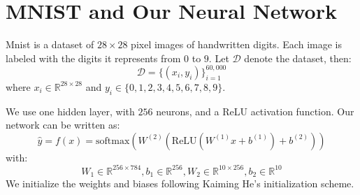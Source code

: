 \documentclass[10pt,a4paper]{article}
\begin{document}
\section{MNIST and Our Neural Network}
Mnist is a dataset of $28 \times 28$ pixel images of handwritten digits. Each image is labeled with the digits it represents from $0$ to $9$. Let $\mathcal{D}$ denote the dataset, then:
$$\mathcal{D} = \{(x_i, y_i)\}_{i=1}^{60,000}$$
where $x_i \in \mathbb{R}^{28 \times 28}$ and $y_i \in \{0, 1, 2, 3, 4, 5, 6, 7, 8, 9\}$. 

\noindent We use one hidden layer, with $256$ neurons, and a ReLU activation function. Our network can be written as:
$$\hat{y} = f(x) = \text{softmax}(W^{(2)}(\text{ReLU}(W^{(1)}x + b^{(1)}) + b^{(2)}))$$
with:
$$W_1 \in \mathbb{R}^{256 \times 784}, b_1 \in \mathbb{R}^{256}, W_2 \in \mathbb{R}^{10 \times 256}, b_2 \in \mathbb{R}^{10}$$
We initialize the weights and biases following Kaiming He's initialization scheme.

\pagebreak
\nocite{*}



\end{document}

